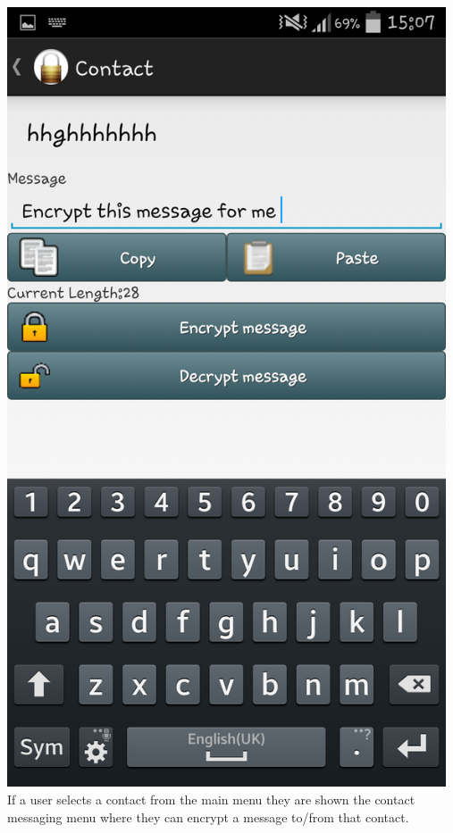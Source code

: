 \begin{center}
 \includegraphics[width=13cm]{screenshots/normal/5_ContactPreEncrypt.png}
 If a user selects a contact from the main menu they are shown the contact messaging menu where they can encrypt a message to/from that contact.
\end{center}
